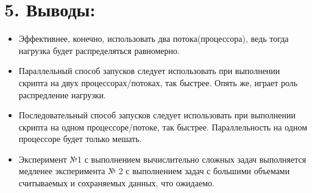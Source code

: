 \documentclass[10pt, a4paper]{article}
\begin{document}
\section*{5. Выводы:}
\begin{itemize}
    \item Эффективнее, конечно, использовать два потока(процессора), ведь тогда нагрузка будет распределяться равномерно. 
    \item Параллельный способ запусков следует использовать при выполнении скрипта на двух процессорах/потоках, так быстрее. Опять же, играет роль распредление нагрузки.
    \item Последовательный способ запусков следует использовать при выполнении скрипта на одном процессоре/потоке, так быстрее. Параллельность на одном процессоре будет только мешать. 
    \item Эксперимент №1 с выполнением вычислительно сложных задач выполняется медленее эксперимента № 2 с выполнением задач с большими объемами считываемых и сохраняемых данных, что ожидаемо.
\end{itemize}
\end{document}
